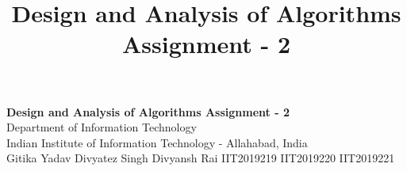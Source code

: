 \documentclass[10pt]{article}
\author{}
\title{\Large{Design and Analysis of Algorithms Assignment - 2}}
\begin{document}
	\begin{center}
		{\Large \textbf{Design and Analysis of Algorithms Assignment - 2}}\\
		\vspace{1em}
		{\large Department of Information Technology}\\
		\vspace{1em}
		\large{Indian Institute of Information Technology - Allahabad, India}\\
		\vspace{1em}
		\large{Gitika Yadav \hspace{10em} Divyatez Singh \hspace{9em} Divyansh Rai}
		\large{IIT2019219 \hspace{10.5em} IIT2019220 \hspace{10.5em} IIT2019221}
		
		\vspace{2.5em}
	\end{center}
	
\end{document}
